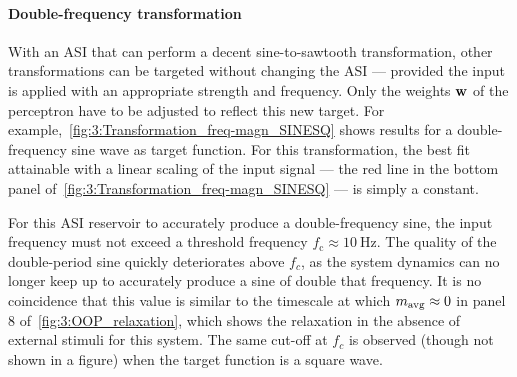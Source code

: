 \paragraph{Double-frequency transformation}
With an ASI that can perform a decent sine-to-sawtooth transformation, other transformations can be targeted without changing the ASI --- provided the input is applied with an appropriate strength and frequency.
Only the weights $\boldsymbol{\mathbf{w}}$ of the perceptron have to be adjusted to reflect this new target.
For example,~\cref{fig:3:Transformation_freq-magn_SINESQ} shows results for a double-frequency sine wave as target function.
For this transformation, the best fit attainable with a linear scaling of the input signal --- the red line in the bottom panel of~\cref{fig:3:Transformation_freq-magn_SINESQ} --- is simply a constant.


For this ASI reservoir to accurately produce a double-frequency sine, the input frequency must not exceed a threshold frequency $f_\mathrm{c} \approx \SI{10}{\hertz}$.
The quality of the double-period sine quickly deteriorates above $f_c$, as the system dynamics can no longer keep up to accurately produce a sine of double that frequency.
It is no coincidence that this value is similar to the timescale at which $m_\mathrm{avg} \approx 0$ in panel 8 of~\cref{fig:3:OOP_relaxation}, which shows the relaxation in the absence of external stimuli for this system.
The same cut-off at $f_c$ is observed (though not shown in a figure) when the target function is a square wave.

